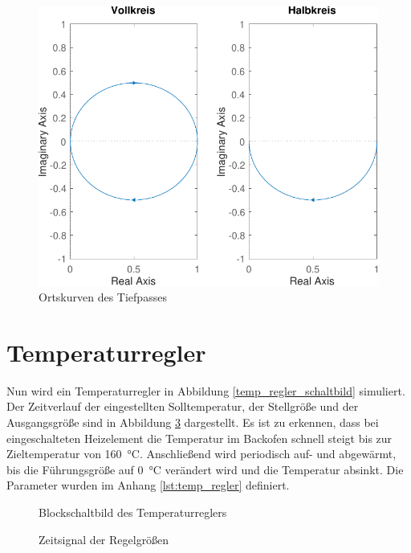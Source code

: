 \documentclass[
    paper=a4,
    fontsize=10pt,
    DIV=13,
    oneside,
]{scrartcl}
\begin{document}
    \begin{figure}
        \centering
        \includegraphics[width=\imagewidth]{../versuch1/ortskurve}
        \caption{Ortskurven des Tiefpasses}
        \label{fig:ortskurve}
    \end{figure}

\section{Temperaturregler}
    Nun wird ein Temperaturregler in Abbildung \ref{temp_regler_schaltbild} simuliert. Der Zeitverlauf der eingestellten Solltemperatur, der Stellgröße und der Ausgangsgröße sind in Abbildung \ref{fig:temp_regler} dargestellt. Es ist zu erkennen, dass bei eingeschalteten Heizelement die Temperatur im Backofen schnell steigt bis zur Zieltemperatur von \SI{160}{\celsius}. Anschließend wird periodisch auf- und abgewärmt, bis die Führungsgröße auf \SI{0}{\celsius} verändert wird und die Temperatur absinkt. Die Parameter wurden im Anhang \ref{lst:temp_regler} definiert.

    \begin{figure}
        \centering
        \caption{Blockschaltbild des Temperaturreglers}
        \label{fig:temp_regler_schaltbild}
    \end{figure}    

    \begin{figure}
        \centering
        \caption{Zeitsignal der Regelgrößen}
        \label{fig:temp_regler}
    \end{figure}
\end{document}
